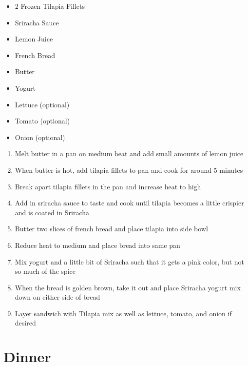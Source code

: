 \documentclass[oneside]{recipe}
\newcommand{\recipecolumn}[2]{
	\begin{multicols}{2}
	\raggedcolumns
	#1
	\columnbreak
	#2
	\end{multicols}
}
\begin{document}
\recipecolumn{
	\begin{itemize}
		\item 2 Frozen Tilapia Fillets
		\item Sriracha Sauce
		\item Lemon Juice
		\item French Bread
		\item Butter
		\item Yogurt
		\item Lettuce (optional)
		\item Tomato (optional)
		\item Onion (optional)
	\end{itemize}
}{
	\begin{enumerate}
		\item Melt butter in a pan on medium heat and add small amounts of lemon juice
		\item When butter is hot, add tilapia fillets to pan and cook for around 5 minutes
		\item Break apart tilapia fillets in the pan and increase heat to high
		\item Add in sriracha sauce to taste and cook until tilapia becomes a little crispier and is coated in Sriracha
		\item Butter two slices of french bread and place tilapia into side bowl
		\item Reduce heat to medium and place bread into same pan
		\item Mix yogurt and a little bit of Sriracha such that it gets a pink color, but not so much of the spice
		\item When the bread is golden brown, take it out and place Sriracha yogurt mix down on either side of bread
		\item Layer sandwich with Tilapia mix as well as lettuce, tomato, and onion if desired
	\end{enumerate}
}

\chapter{Dinner}
 
\end{document}
